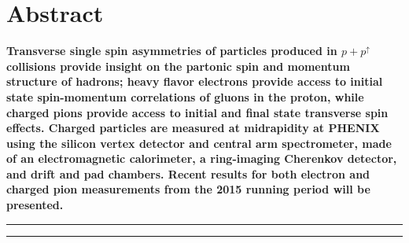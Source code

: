 \documentclass[submission, Proceedings]{SciPost}
\begin{document}
\section*{Abstract}
{\bf
    Transverse single spin asymmetries of particles produced in $p+p^{\uparrow}$ collisions provide insight on the partonic spin and momentum structure of hadrons; heavy flavor electrons provide access to initial state spin-momentum correlations of gluons in the proton, while charged pions provide access to initial and final state transverse spin effects. Charged particles are measured at midrapidity at PHENIX using the silicon vertex detector and central arm spectrometer, made of an electromagnetic calorimeter, a ring-imaging Cherenkov detector, and drift and pad chambers. Recent results for both electron and charged pion measurements from the 2015 running period will be presented.
}


\vspace{10pt}
\noindent\rule{\textwidth}{1pt}
\tableofcontents\thispagestyle{fancy}
\noindent\rule{\textwidth}{1pt}
\vspace{10pt}
\end{document}
